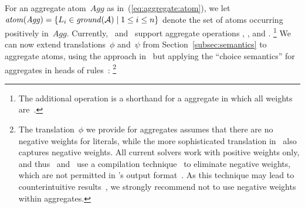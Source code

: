 For an aggregate atom~$\mathit{Agg}$ as in~(\ref{eq:aggregate:atom}),
we let $\atom{\mathit{Agg}}=\{L_i\in\nolinebreak\ground{\mathcal{A}}\mid 1\leq i\leq n\}$
denote the set of atoms occurring positively in~$\mathit{Agg}$.
Currently, \gringo\ and \clingo\ support aggregate operations
, , and .%
\footnote{%
  The additional operation  is a shorthand for a 
  aggregate in which all weights are~.}
We can now extend translations~$\phi$ and~$\psi$ from Section~\ref{subsec:semantics}
to aggregate atoms, 
using the approach in~\cite{ferraris05a} but
applying the ``choice semantics'' for aggregates
in heads of rules~\cite{ferlif05a,siniso02a}:%
\footnote{%
  The translation~$\phi$ we provide for  aggregates
  assumes that there are no negative weights for literals,
  while the more sophisticated translation in~\cite{ferraris05a} also
  captures negative weights.
  All current solvers work with positive weights only, and thus
  \gringo\ and \lparse\ use a compilation technique~\cite{siniso02a}
  to eliminate negative weights, which are not permitted in
  \lparse's output format~\cite{lparseManual}.
  As this technique may lead to counterintuitive results~\cite{ferraris05a},
  we strongly recommend not to use negative weights within  aggregates.}
